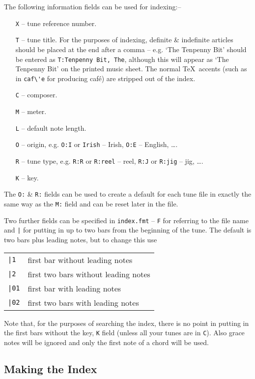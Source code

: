 The following information fields can be used for indexing:--
\begin{itemize}
\item[{\tt X}] -- tune reference number.
\item[{\tt T}] -- tune title. For the purposes of indexing,
definite \& indefinite articles should be placed
at the end after a comma -- e.g. `The Tenpenny Bit' should be entered as
{\tt T:Tenpenny Bit, The}, although this will appear as `The Tenpenny Bit'
on the printed music sheet. The normal \TeX\ accents (such as in \verb+caf\'e+
for producing caf\'e) are stripped out of the index.
\item[{\tt C}] -- composer.
\item[{\tt M}] -- meter.
\item[{\tt L}] -- default note length.
\item[{\tt O}] -- origin, e.g. {\tt O:I} or {\tt Irish} -- Irish, {\tt O:E} --
English, \ldots.
\item[{\tt R}] -- tune type, e.g. {\tt R:R} or {\tt R:reel} -- reel, {\tt R:J}
or {\tt R:jig}
-- jig, \ldots.
\item[{\tt K}] -- key.
\end{itemize}

The {\tt O:} \& {\tt R:} fields can be used to create a default for
each tune file in exactly the same way as the {\tt M:} field and can be reset
later in the file.

Two further fields can be specified in {\tt index.fmt} -- {\tt F} for referring
to the file name and {\tt |} for putting in up to two bars from the beginning
of the tune. The default is two bars plus leading notes, but to change this use

\begin{tabular}{ll}
{\tt |1}  & first bar without leading notes \\
{\tt |2}  & first two bars without leading notes \\
{\tt |01}  & first bar with leading notes \\
{\tt |02}  & first two bars with leading notes
\end{tabular}

Note that, for the purposes of searching the index, there
is no point in putting in the first bars without the key, {\tt K} field (unless
all your tunes are in {\tt C}). Also grace notes will be ignored and only
the first note of a chord will be used.

\subsection{Making the Index}


